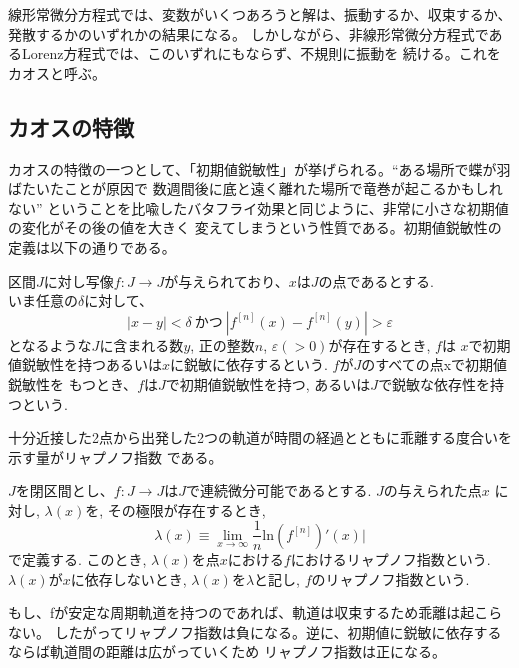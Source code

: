 \documentclass[12pt]{ltjsarticle}
\begin{document}
線形常微分方程式では、変数がいくつあろうと解は、振動するか、収束するか、発散するかのいずれかの結果になる。
しかしながら、非線形常微分方程式であるLorenz方程式では、このいずれにもならず、不規則に振動を
続ける。これをカオスと呼ぶ。

\subsection{カオスの特徴}
カオスの特徴の一つとして、「初期値鋭敏性」が挙げられる。“ある場所で蝶が羽ばたいたことが原因で
数週間後に底と遠く離れた場所で竜巻が起こるかもしれない”
ということを比喩したバタフライ効果と同じように、非常に小さな初期値の変化がその後の値を大きく
変えてしまうという性質である。初期値鋭敏性の定義は以下の通りである。\\
\begin{tcolorbox}
    区間$J$に対し写像$f:J \rightarrow J$が与えられており、$x$は$J$の点であるとする.\\
    いま任意の$\delta$に対して、
    \begin{equation*}
        |x-y| < \delta \ かつ \ |f^{[n]}(x) - f^{[n]}(y)| > \varepsilon
    \end{equation*}
    となるような$J$に含まれる数$y$, 正の整数$n$, $\varepsilon(>0)$が存在するとき, $f$は
    $x$で初期値鋭敏性を持つあるいは$x$に鋭敏に依存するという. $f$が$J$のすべての点xで初期値鋭敏性を
    もつとき、$f$は$J$で初期値鋭敏性を持つ, あるいは$J$で鋭敏な依存性を持つという.\cite{chaos}
\end{tcolorbox}

十分近接した2点から出発した2つの軌道が時間の経過とともに乖離する度合いを示す量がリャプノフ指数
である。\\
\begin{tcolorbox}
    $J$を閉区間とし、$f:J \rightarrow J$は$J$で連続微分可能であるとする. $J$の与えられた点$x$
    に対し, $\lambda(x)$を, その極限が存在するとき,
    \begin{equation*}
        \lambda(x) \equiv \lim_{x \to \infty} \frac{1}{n}\text{ln}\left(f^{[n]}\right)'(x)|
    \end{equation*}
    で定義する. このとき, $\lambda(x)$を点$x$における$f$におけるリャプノフ指数という.\\
    $\lambda(x)$が$x$に依存しないとき, $\lambda(x)$を$\lambda$と記し, $f$のリャプノフ指数という.\cite{chaos}
\end{tcolorbox}

もし、fが安定な周期軌道を持つのであれば、軌道は収束するため乖離は起こらない。
したがってリャプノフ指数は負になる。逆に、初期値に鋭敏に依存するならば軌道間の距離は広がっていくため
リャプノフ指数は正になる。
\end{document}
